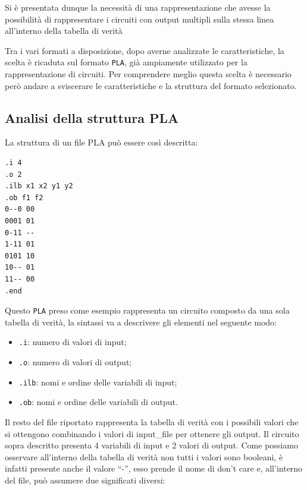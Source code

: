 \documentclass[
]{book}
\providecommand{\tightlist}{%
  \setlength{\itemsep}{0pt}\setlength{\parskip}{0pt}}
\begin{document}
\newpage

Si è presentata dunque la necessità di una rappresentazione che avesse la possibilità di rappresentare i circuiti con output multipli sulla stessa linea all'interno della tabella di verità

Tra i vari formati a disposizione, dopo averne analizzate le caratteristiche, la scelta è ricaduta sul formato \texttt{PLA}, già ampiamente utilizzato per la rappresentazione di circuiti.
Per comprendere meglio questa scelta è necessario però andare a sviscerare le caratteristiche e la struttura del formato selezionato.

\hypertarget{analisi-della-struttura-pla}{%
\subsection{Analisi della struttura PLA}\label{analisi-della-struttura-pla}}

La struttura di un file PLA può essere così descritta:

\begin{verbatim}
.i 4
.o 2
.ilb x1 x2 y1 y2
.ob f1 f2
0--0 00    
0001 01
0-11 --
1-11 01
0101 10
10-- 01
11-- 00
.end
\end{verbatim}

Questo \texttt{PLA} preso come esempio rappresenta un circuito composto da una sola tabella di verità, la sintassi va a descrivere gli elementi nel seguente modo:

\begin{itemize}
\tightlist
\item
  \texttt{.i}: numero di valori di input;
\item
  \texttt{.o}: numero di valori di output;
\item
  \texttt{.ilb}: nomi e ordine delle variabili di input;
\item
  \texttt{.ob}: nomi e ordine delle variabili di output.
\end{itemize}

\newpage

Il resto del file riportato rappresenta la tabella di verità con i possibili valori che si ottengono combinando i valori di input\_file per ottenere gli output. Il circuito sopra descritto presenta 4 variabili di input e 2 valori di output. Come possiamo osservare all'interno della tabella di verità non tutti i valori sono booleani, è infatti presente anche il valore ``-'', esso prende il nome di don't care e, all'interno del file, può assumere due significati diversi:
\end{document}
